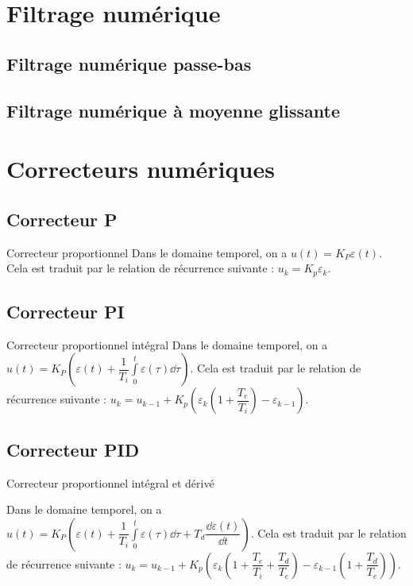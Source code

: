 \section{Filtrage numérique}
\subsection{Filtrage numérique passe-bas}

\subsection{Filtrage numérique à moyenne glissante} 

\section{Correcteurs numériques}
 
\subsection{Correcteur P}
\begin{defi}{Correcteur proportionnel}
Dans le domaine temporel, on a $u(t)=K_P \varepsilon(t)$. Cela est traduit par le relation de récurrence suivante : 
$u_k = K_p \varepsilon_k$.
\end{defi}
\subsection{Correcteur PI}
\begin{defi}{Correcteur proportionnel intégral}
Dans le domaine temporel, on a $u(t)=K_P  \left(\varepsilon(t)+\dfrac{1}{T_i}\int\limits_0^t \varepsilon(\tau) \dd \tau \right)$. Cela est traduit par le relation de récurrence suivante : 
$u_k = u_{k-1} +  K_p \left( \varepsilon_k \left( 1+\dfrac{T_e}{T_i}\right) - \varepsilon_{k-1} \right)$.
\end{defi}

\subsection{Correcteur PID}
\begin{defi}{Correcteur proportionnel intégral et dérivé}

Dans le domaine temporel, on a $u(t)=K_P  \left(\varepsilon(t)+\dfrac{1}{T_i}\int\limits_0^t \varepsilon(\tau) \dd \tau +T_d \dfrac{\dd \varepsilon(t)}{\dd t}\right)$. Cela est traduit par le relation de récurrence suivante : 
$u_k = u_{k-1} + K_p \left( \varepsilon_k \left( 1+\dfrac{T_e}{T_i}+\dfrac{T_d}{T_e}\right) - \varepsilon_{k-1} \left( 1+\dfrac{T_d}{T_e}\right)\right)$.
\end{defi}


